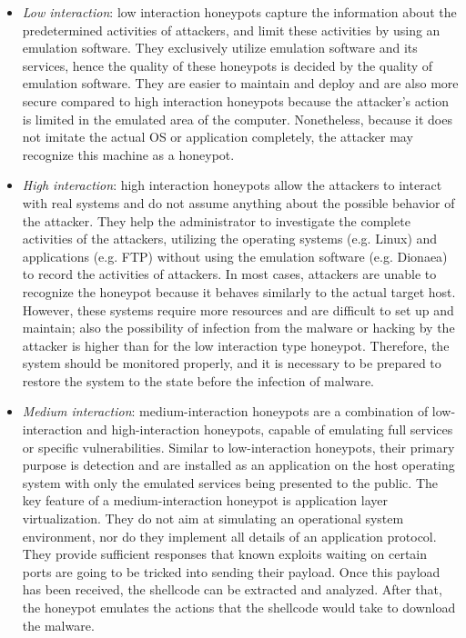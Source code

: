 \documentclass[epsfig,a4paper,11pt,titlepage,oneside,openany]{book}
\begin{document}
\begin{itemize}
\item \textit{Low interaction}: low interaction honeypots capture the information about the predetermined activities of attackers, and limit these activities by using an emulation software. They exclusively utilize emulation software and its services, hence the quality of these honeypots is decided by the quality of emulation software. They are easier to maintain and deploy and are also more secure compared to high interaction honeypots because the attacker’s action is limited in the emulated area of the computer. Nonetheless, because it does not imitate the actual OS or application completely, the attacker may recognize this machine as a honeypot. 

\item \textit{High interaction}: high interaction honeypots allow the attackers to interact with real systems and do not assume anything about the possible behavior of the attacker. They help the administrator to investigate the complete activities of the attackers, utilizing the operating systems (e.g. Linux) and applications (e.g. FTP) without using the emulation software (e.g. Dionaea) to record the activities of attackers. In most cases, attackers are unable to recognize the honeypot because it behaves similarly to the actual target host. However, these systems require more resources and are difficult to set up and maintain; also the possibility of infection from the malware or hacking by the attacker is higher than for the low interaction type honeypot. Therefore, the system should be monitored properly, and it is necessary to be prepared to restore the system to the state before the infection of malware.

\item \textit{Medium interaction}: medium-interaction honeypots are a combination of low-interaction and high-interaction honeypots, capable of emulating full services or specific vulnerabilities. Similar to low-interaction honeypots, their primary purpose is detection and are installed as an application on the host operating system with only the emulated services being presented to the public. The key feature of a medium-interaction honeypot is application layer virtualization. They do not aim at simulating an operational system environment, nor do they implement all details of an application protocol. They provide sufficient responses that known exploits waiting on certain ports are going to be tricked into sending their payload. Once this payload has been received, the shellcode can be extracted and analyzed. After that, the honeypot emulates the actions that the shellcode would take to download the malware.
 
\end{itemize}
\end{document}

